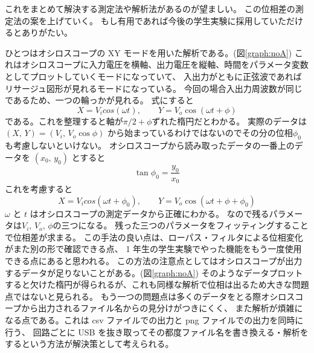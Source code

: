 \documentclass[11pt,dvipdfmx,a4paper]{jsarticle}
\begin{document}
これをまとめて解決する測定法や解析法があるのが望ましい。
この位相差の測定法の案を上げていく。
もし有用であれば今後の学生実験に採用していただけるとありがたい。

ひとつはオシロスコープの XY モードを用いた解析である。(図\ref{graph:noA})
これはオシロスコープに入力電圧を横軸、出力電圧を縦軸、時間をパラメータ変数としてプロットしていくモードになっていて、
入出力がともに正弦波であればリサージュ図形が見れるモードになっている。
今回の場合入出力周波数が同じであるため、一つの輪っかが見れる。
式にすると
\begin{equation}
	X = V_{i}cos(\omega t),\qquad Y = V_{o}\cos(\omega t+\phi)
\end{equation}
である。これを整理すると軸が\(\pi/2+\phi\)ずれた楕円だとわかる。
実際のデータは\((X,\,Y) = (V_{i},\,V_{o}\cos\phi)\) から始まっているわけではないのでその分の位相\(\phi_0\)も考慮しないといけない。
オシロスコープから読み取ったデータの一番上のデータを \((x_0,\,y_0)\) とすると
\begin{equation}
	\tan\phi_0 = \frac{y_0}{x_0}
\end{equation}
これを考慮すると
\begin{equation}
	X = V_{i}cos(\omega t + \phi_0),\qquad Y = V_{o}\cos(\omega t + \phi + \phi_0)
\end{equation}
\(\omega\) と \(t\) はオシロスコープの測定データから正確にわかる。
なので残るパラメータは\(V_i,\,V_o,\,\phi\)の三つになる。
残った三つのパラメータをフィッティングすることで位相差が求まる。
この手法の良い点は、ローパス・フィルタによる位相変化がまた別の形で確認できる点、
1 年生の学生実験でやった機能をもう一度使用できる点にあると思われる。
この方法の注意点としてはオシロスコープが出力するデータが足りないことがある。(図\ref{graph:noA})
そのようなデータプロットすると欠けた楕円が得られるが、これも同様な解析で位相は出るため大きな問題点ではないと見られる。
もう一つの問題点は多くのデータをとる際オシロスコープから出力されるファイル名からの見分けがつきにくく、
また解析が煩雑になる点である。これは csv ファイルでの出力と png ファイルでの出力を同時に行う、
回路ごとに USB を抜き取ってその都度ファイル名を書き換える・解析をするという方法が解決策として考えられる。
\end{document}
